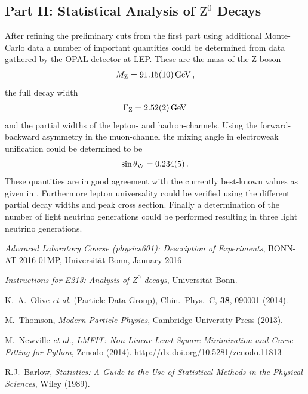 \documentclass[11pt, a4paper]{article}
\numberwithin{equation}{section}
\begin{document}
\subsection{Part II: Statistical Analysis of $\mathrm{Z}^0$ Decays}
After refining the preliminary cuts from the first part using additional Monte-Carlo data a number of important quantities could be determined from data gathered by the OPAL-detector at LEP.
These are the mass of the Z-boson
\begin{align*}
	M_\mathrm{Z} = \SI{91.15 +- 0.10}{GeV} \,\text{,}
\end{align*}
the full decay width
\begin{align*}
	\Gamma_\mathrm{Z} = \SI{2.52 +- 0.02}{GeV}
\end{align*}
and the partial widths of the lepton- and hadron-channels.
Using the forward-backward asymmetry in the muon-channel the mixing angle in electroweak unification could be determined to be
\begin{align*}
	\sin\theta_\mathrm{W} = \num{0.234 +- 0.005} \,\text{.}
\end{align*}
These quantities are in good agreement with the currently best-known values as given in \cite{pdg}.
Furthermore lepton universality could be verified using the different partial decay widths and peak cross section.
Finally a determination of the number of light neutrino generations could be performed resulting in three light neutrino generations.

\FloatBarrier
\vspace{\fill}
\begin{thebibliography}{19}
	\emph{Advanced Laboratory Course (physics601): Description of Experiments}, BONN-AT-2016-01MP, Universität Bonn, January 2016

	\emph{Instructions for E213: Analysis of $Z^0$ decays},
	Universität Bonn.
	
	K.\ A.\ Olive \textit{et al.} (Particle Data Group),
	Chin.\ Phys.\ C, \textbf{38}, 090001 (2014).
	
	M.\ Thomson, \emph{Modern Particle Physics}, Cambridge University Press (2013).

	M.\ Newville \textit{et al.},
	\emph{LMFIT: Non-Linear Least-Square Minimization and Curve-Fitting for Python}, Zenodo (2014). \url{http://dx.doi.org/10.5281/zenodo.11813}

	R.J.\ Barlow,
	\emph{Statistics: A Guide to the Use of Statistical Methods in the Physical Sciences},
	Wiley (1989).
	
\end{thebibliography}
\end{document}

